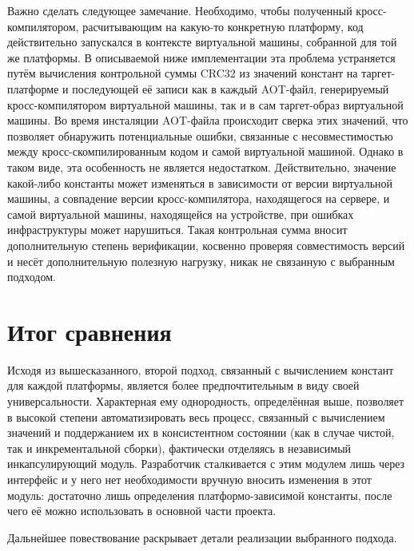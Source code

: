 \par
Важно сделать следующее замечание.
Необходимо, чтобы полученный кросс-компилятором, расчитывающим на какую-то конкретную платформу, код действительно запускался в контексте виртуальной машины, собранной для той же платформы.
В описываемой ниже имплементации эта проблема устраняется путём вычисления контрольной суммы CRC32 из значений констант на таргет-платформе и последующей её записи как в каждый AOT-файл, генерируемый кросс-компилятором виртуальной машины, так и в сам таргет-образ виртуальной машины.
Во время инсталяции AOT-файла происходит сверка этих значений, что позволяет обнаружить потенциальные ошибки, связанные с несовместимостью между кросс-скомпилированным кодом и самой виртуальной машиной.
Однако в таком виде, эта особенность не является недостатком.
Действительно, значение какой-либо константы может изменяться в зависимости от версии виртуальной машины, а совпадение версии кросс-компилятора, находящегося на сервере, и самой виртуальной машины, находящейся на устройстве, при ошибках инфраструктуры может нарушиться.
Такая контрольная сумма вносит дополнительную степень верификации, косвенно проверяя совместимость версий и несёт дополнительную полезную нагрузку, никак не связанную с выбранным подходом. 

\section{Итог сравнения}
Исходя из вышесказанного, второй подход, связанный с вычислением констант для каждой платформы, является более предпочтительным в виду своей универсальности.
Характерная ему однородность, определённая выше, позволяет в высокой степени автоматизировать весь процесс, связанный с вычислением значений и поддержанием их в консистентном состоянии (как в случае чистой, так и инкрементальной сборки), фактически отделяясь в независимый инкапсулирующий модуль.
Разработчик сталкивается с этим модулем лишь через интерфейс и у него нет необходимости вручную вносить изменения в этот модуль: достаточно лишь определения платформо-зависимой константы, после чего её можно использовать в основной части проекта.

\par
Дальнейшее повествование раскрывает детали реализации выбранного подхода.
 
\newpage